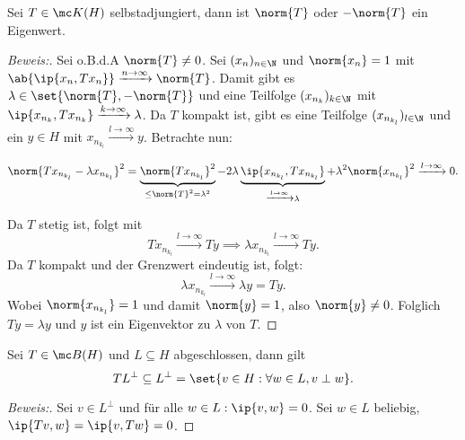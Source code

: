\begin{theorem}
	\label{operatornorm_ev}
	Sei $T \in \mc K(H)$ selbstadjungiert, dann ist $\norm{T}$ oder $-\norm{T}$ ein Eigenwert.
	
	\begin{proof}[Beweis:]
		
		Sei o.B.d.A $\norm{T} \not= 0$. Sei $(x_n)_{n \in \N}$ und $\norm{x_n} = 1$ mit $\ab{\ip{x_n, Tx_n}} \xrightarrow{n \to \infty} \norm{T}$. Damit gibt es $\lambda \in \set{\norm{T}, -\norm{T}}$ und eine Teilfolge $(x_{n_k})_{k \in \N}$ mit $\ip{x_{n_k}, Tx_{n_k}} \xrightarrow{k \to \infty} \lambda$. Da $T$ kompakt ist, gibt es eine Teilfolge $(x_{n_{k_l}})_{l \in \N}$ und ein $y \in H$ mit $x_{n_{k_l}} \xrightarrow{l \to \infty} y$. Betrachte nun:
		
		\[ \norm{Tx_{n_{k_l}} - \lambda x_{n_{k_l}}}^2 = \underbrace{\norm{T x_{n_{k_l}}}^2}_{\leq \norm{T}^2 = \lambda^2} - 2 \lambda \underbrace{\ip{x_{n_{k_l}}, T x_{n_{k_l}}}}_{\xrightarrow{l \to \infty} \lambda} + \lambda^2 \norm{x_{n_{k_l}}}^2 \xrightarrow{l \to \infty} 0. \]
		
		
		Da $T$ stetig ist, folgt mit \[T x_{n_{k_l}} \xrightarrow{l \to \infty} Ty \implies \lambda x_{n_{k_l}} \xrightarrow{l \to \infty} Ty.\] Da $T$ kompakt und der Grenzwert eindeutig ist, folgt: \[\lambda x_{n_{k_l}} \xrightarrow{l \to \infty} \lambda y = Ty.\] Wobei $\norm{x_{n_{k_l}}} = 1$ und damit $\norm{y} = 1$, also $\norm{y} \not= 0$. Folglich $Ty = \lambda y$ und $y$ ist ein Eigenvektor zu $\lambda$ von $T$.
		
	\end{proof}
	
\end{theorem}


\begin{theorem}
	
	Sei $T \in \mc B(H)$ und $L \subseteq H$ abgeschlossen, dann gilt \[TL^{\perp} \subseteq L^{\perp} = \set{v \in H: \forall w \in L, v \perp w}.\]
	
	\begin{proof}[Beweis:]
		
		Sei $v \in L^{\perp}$ und für alle $w \in L: \ip{v, w} = 0$. Sei $w \in L$ beliebig, $\ip{Tv, w} = \ip{v, Tw} = 0$.
		
	\end{proof}
	
\end{theorem}